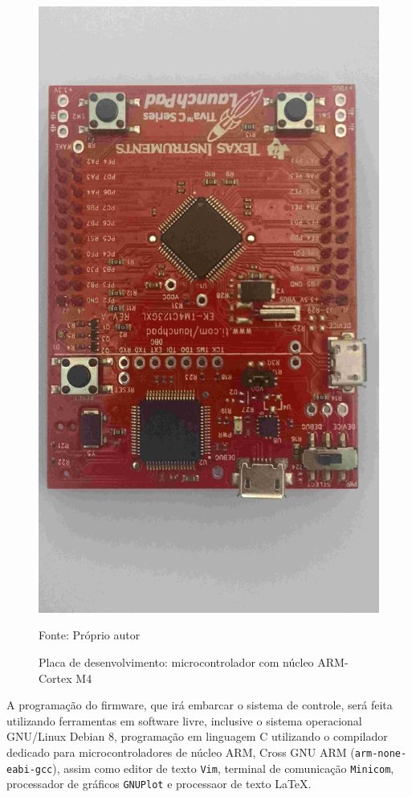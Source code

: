 \begin{figure}[!htb]
\caption{Placa de desenvolvimento: microcontrolador com núcleo ARM-Cortex M4}
\center\includegraphics[scale=0.08, angle=180, clip=true, trim=0 750 60 500]{./imagens/uC-ARM.jpg}
\label{fig:uCarm}

{\small Fonte: Próprio autor}
\end{figure}

A programação do firmware, que irá embarcar o sistema de controle, será feita utilizando ferramentas em software livre, inclusive o sistema operacional GNU/Linux Debian 8, programação em linguagem C utilizando o compilador dedicado para microcontroladores de núcleo ARM, Cross GNU ARM (\texttt{arm-none-eabi-gcc}), assim como editor de texto \texttt{Vim}, terminal de comunicação \texttt{Minicom}, processador de gráficos \texttt{GNUPlot} e processaor de texto \LaTeX.








